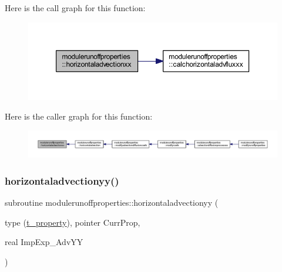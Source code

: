 Here is the call graph for this function\+:\nopagebreak
\begin{figure}[H]
\begin{center}
\leavevmode
\includegraphics[width=350pt]{namespacemodulerunoffproperties_add33ed1dc6829db881e5d276d5354ef8_cgraph}
\end{center}
\end{figure}
Here is the caller graph for this function\+:\nopagebreak
\begin{figure}[H]
\begin{center}
\leavevmode
\includegraphics[width=350pt]{namespacemodulerunoffproperties_add33ed1dc6829db881e5d276d5354ef8_icgraph}
\end{center}
\end{figure}
\mbox{\label{namespacemodulerunoffproperties_a23a3ece2ec9c5af37ce26d5c50ba1c03}} 
\subsubsection{\texorpdfstring{horizontaladvectionyy()}{horizontaladvectionyy()}}
{\footnotesize\ttfamily subroutine modulerunoffproperties\+::horizontaladvectionyy (\begin{DoxyParamCaption}\item[{type (\mbox{\hyperlink{structmodulerunoffproperties_1_1t__property}{t\+\_\+property}}), pointer}]{Curr\+Prop,  }\item[{real}]{Imp\+Exp\+\_\+\+Adv\+YY }\end{DoxyParamCaption})\hspace{0.3cm}{\ttfamily [private]}}

